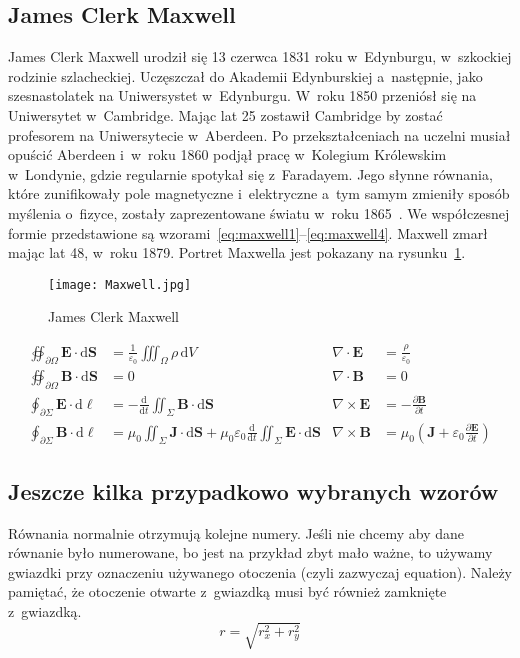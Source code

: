 \subsection{James Clerk Maxwell}
James Clerk Maxwell urodził się 13 czerwca 1831 roku w~Edynburgu, w~szkockiej rodzinie szlacheckiej. Uczęszczał do Akademii Edynburskiej a~następnie, jako szesnastolatek na Uniwersystet w~Edynburgu. W~roku 1850 przeniósł się na Uniwersytet w~Cambridge. Mając lat 25 zostawił Cambridge by zostać profesorem na Uniwersytecie w~Aberdeen. Po przekształceniach na uczelni musiał opuścić Aberdeen i~w~roku 1860 podjął pracę w~Kolegium Królewskim w~Londynie, gdzie regularnie spotykał się z~Faradayem. Jego słynne równania, które zunifikowały pole magnetyczne i~elektryczne a~tym samym zmieniły sposób myślenia o~fizyce, zostały zaprezentowane światu w~roku 1865~\cite{maxwell1865}. We współczesnej formie przedstawione są wzorami~\ref{eq:maxwell1}--\ref{eq:maxwell4}. Maxwell zmarł mając lat 48, w~roku 1879. Portret Maxwella jest pokazany na rysunku~\ref{rys:maxwell}.

\begin{figure}[!t]
	\centering \texttt{[image: Maxwell.jpg]}
	\caption{James Clerk Maxwell}
	\label{rys:maxwell}
\end{figure}

\begin{align}
\oiint\nolimits_{\partial \Omega} \pmb{E} \cdot \mathrm{d}\pmb{S} &= \frac{1}{\varepsilon_0} \iiint\nolimits_\Omega \rho \, \mathrm{d}V &  \nabla \cdot \pmb{E} &= \frac {\rho} {\varepsilon_0} \label{eq:maxwell1} \\
\oiint\nolimits_{\partial \Omega} \pmb{B} \cdot \mathrm{d}\pmb{S} &= 0 & \nabla \cdot \pmb{B} &= 0 \label{eq:maxwell2} \\
\oint\nolimits_{\partial \Sigma} \pmb{E} \cdot \mathrm{d}\boldsymbol{\ell} &= -\frac{\mathrm{d}}{\mathrm{d}t}\iint\nolimits_{\Sigma}\pmb{B}\cdot\mathrm{d}\pmb{S} & \nabla \times \pmb{E} &= -\frac{\partial \pmb{B}}{\partial t} \label{eq:maxwell3} \\
\oint\nolimits_{\partial \Sigma} \pmb{B} \cdot \mathrm{d}\boldsymbol{\ell} &= \mu_0 \iint\nolimits_{\Sigma} \pmb{J} \cdot \mathrm{d}\pmb{S} + \mu_0 \varepsilon_0 \frac{\mathrm{d}}{\mathrm{d}t} \iint\nolimits_{\Sigma} \pmb{E} \cdot \mathrm{d}\pmb{S} & \nabla \times \pmb{B} &= \mu_0\left(\pmb{J} + \varepsilon_0 \frac{\partial \pmb{E}} {\partial t} \right) \label{eq:maxwell4}
\end{align}


\subsection{Jeszcze kilka przypadkowo wybranych wzorów}
Równania normalnie otrzymują kolejne numery. Jeśli nie chcemy aby dane równanie było numerowane, bo jest na przykład zbyt mało ważne, to używamy gwiazdki przy oznaczeniu używanego otoczenia (czyli zazwyczaj equation). Należy pamiętać, że otoczenie otwarte z~gwiazdką musi być również zamknięte z~gwiazdką.
\begin{equation*}
    r = \sqrt{r_x^2 + r_y^2}
\end{equation*}

